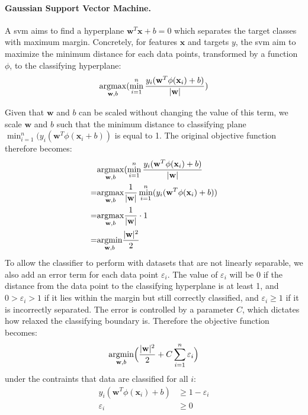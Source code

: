 \paragraph{Gaussian Support Vector Machine.}
A \gls{svm} aims to find a hyperplane $\mathbf{w}^T\mathbf{x}+b=0$ which separates the target classes with maximum margin. Concretely, for features $\mathbf{x}$ and targets $y$, the \gls{svm} aim to maximize the minimum distance for each data points, transformed by a function $\phi$, to the classifying hyperplane:
\begin{equation} \label{dist}
    \underset{\mathbf{w},b}{\operatorname{argmax}}(\min_{i=1}^{n}\frac{y_i(\mathbf{w}^T\phi(\mathbf{x}_i)+b)}{|\mathbf{w}|})
\end{equation}
 
Given that $\mathbf{w}$ and $b$ can be scaled without changing the value of this term, we scale $\mathbf{w}$ and $b$ such that the minimum distance to classifying plane $\min_{i=1}^n(y_i(\mathbf{w}^T\phi(\mathbf{x}_i + b))$ is equal to 1. The original objective function therefore becomes:
\begin{align*}
    &\underset{\mathbf{w},b}{\operatorname{argmax}}(\min_{i=1}^{n}\frac{y_i(\mathbf{w}^T\phi(\mathbf{x}_i)+b)}{|\mathbf{w}|} \\
    =&\underset{\mathbf{w},b}{\operatorname{argmax}}\frac{1}{|\mathbf{w}|}\min_{i=1}^{n}(y_i(\mathbf{w}^T\phi(\mathbf{x}_i)+b)) \\
    =&\underset{\mathbf{w},b}{\operatorname{argmax}}\frac{1}{|\mathbf{w}|} \cdot 1 \\
    =&\underset{\mathbf{w},b}{\operatorname{argmin}}\frac{|\mathbf{w}|^2}{2}
\end{align*}
To allow the classifier to perform with datasets that are not linearly separable, we also add an error term for each data point $\varepsilon_i$. The value of $\varepsilon_i$ will be $0$ if the distance from the data point to the classifying hyperplane is at least 1, and $0>\varepsilon_i>1$ if it lies within the margin but still correctly classified, and $\varepsilon_i \geq 1$ if it is incorrectly separated. The error is controlled by a parameter $C$, which dictates how relaxed the classifying boundary is. Therefore the objective function becomes:
\begin{equation*}
    \underset{\mathbf{w},b}{\operatorname{argmin}}\Big(\frac{|\mathbf{w}|^2}{2} + C\sum_{i=1}^n \varepsilon_i\Big)
\end{equation*}
under the contraints that data are classified for all $i$:
\begin{align*}
    y_i (\mathbf{w}^T\phi(\mathbf{x}_i) + b) &\geq 1 - \varepsilon_i \\ 
    \varepsilon_i &\geq 0
\end{align*}
